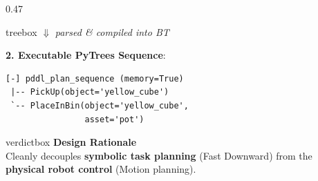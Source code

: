 \documentclass[10pt]{beamer}
\begin{document}
\begin{frame}[fragile]
\begin{columns}[T]
\begin{column}{0.47\textwidth}
\begin{beamercolorbox}[sep=5pt,rounded=true,shadow=true]{treebox}
            \vspace{-0.2cm}
            \centering \tiny $\boldsymbol{\Downarrow}$ \textit{parsed \& compiled into BT} \par
            \vspace{0.1cm}

            \raggedright \tiny \textbf{2. Executable PyTrees Sequence}:
            \begin{verbatim}
[-] pddl_plan_sequence (memory=True)
 |-- PickUp(object='yellow_cube')
 `-- PlaceInBin(object='yellow_cube',
                asset='pot')
            \end{verbatim}
        \end{beamercolorbox}

        \vspace{0.15cm}
        \begin{beamercolorbox}[sep=4pt,shadow=true,rounded=true]{verdictbox}
            \scriptsize \textbf{Design Rationale} \\
            \tiny Cleanly decouples \textbf{symbolic task planning} (Fast Downward) from the \textbf{physical robot control} (Motion planning).
        \end{beamercolorbox}
    \end{column}
\end{columns}
\end{frame}
\end{document}
